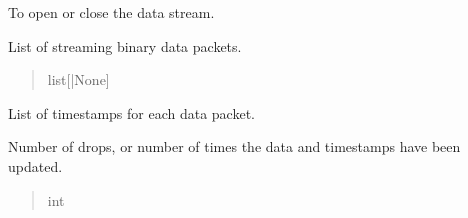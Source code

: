 \documentclass[letterpaper,10pt,english]{sphinxmanual}
\begin{document}
\begin{fulllineitems}
\begin{fulllineitems}
\label{\detokenize{Morelia.Stream.Collect:Morelia.Stream.Collect.DataHose.Hose.deviceValve}}
\pysigstartsignatures
{}
\pysigstopsignatures
\sphinxAtStartPar
To open or close the data stream.
\begin{quote}\begin{description}
\sphinxAtStartPar
{\hyperref[\detokenize{Morelia.Stream.Collect:Morelia.Stream.Collect.DeviceValve.Valve}]{}}

\end{description}\end{quote}

\end{fulllineitems}


\begin{fulllineitems}
\label{\detokenize{Morelia.Stream.Collect:Morelia.Stream.Collect.DataHose.Hose.data}}
\pysigstartsignatures
{}
\pysigstopsignatures
\sphinxAtStartPar
List of streaming binary data packets.
\begin{quote}\begin{description}
\sphinxAtStartPar
list{[}{\hyperref[\detokenize{Morelia.Packets:Morelia.Packets.Packet.Packet}]{}}|None{]}

\end{description}\end{quote}

\end{fulllineitems}



\begin{fulllineitems}

\pysigstartsignatures
{}
\pysigstopsignatures
\sphinxAtStartPar
List of timestamps for each data packet.

\end{fulllineitems}


\begin{fulllineitems}
\label{\detokenize{Morelia.Stream.Collect:Morelia.Stream.Collect.DataHose.Hose.numDrops}}
\pysigstartsignatures
{}
\pysigstopsignatures
\sphinxAtStartPar
Number of drops, or number of times the data and             timestamps have been updated.
\begin{quote}\begin{description}
\sphinxAtStartPar
int


\end{description}
\end{quote}
\end{fulllineitems}
\end{fulllineitems}
\end{document}
